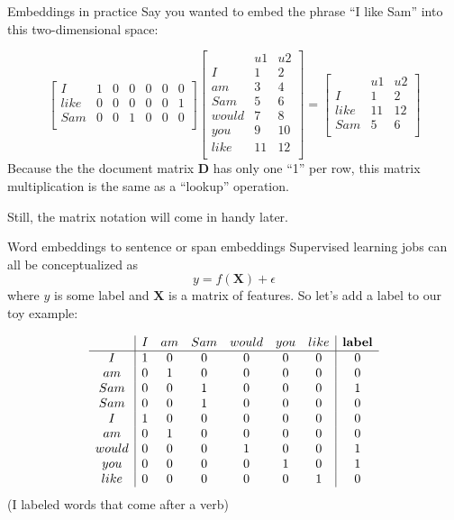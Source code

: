 \documentclass[10pt]{beamer}
\begin{document}
\begin{frame}{Embeddings in practice}
Say you wanted to embed the phrase ``I like Sam'' into this two-dimensional space:

\[ 
\left[
\begin{array}{c|cccccc}
I    & 1 & 0  & 0   & 0     & 0   &  0 \\
like & 0 & 0  & 0   & 0     & 0   &  1 \\
Sam  & 0 & 0  & 1   & 0     & 0   &  0 \\
\end{array}\right]
\left[\begin{array}{c|cccccc}
     & u1 & u2 \\
     \hline
I    & 1 & 2 \\
am   & 3 & 4  \\
Sam  & 5 & 6   \\
would& 7 & 8  \\
you  & 9 & 10  \\
like & 11 & 12  \\
\end{array}\right] = 
\left[
\begin{array}{c|cccccc}
     & u1 & u2 \\
     \hline
I    & 1 & 2 \\
like & 11 & 12  \\
Sam  & 5 & 6   \\
\end{array}
\right]
\] 
Because the the document matrix $\bm{D}$ has only one ``1'' per row, this matrix multiplication is the same as a ``lookup'' operation.

Still, the matrix notation will come in handy later.

\end{frame}


\begin{frame}{Word embeddings to sentence or span embeddings}
Supervised learning jobs can all be conceptualized as 
\[
y = f(\bm{X}) + \epsilon
\]
where $y$ is some label and $\bm{X}$ is a matrix of features.  So let's add a label to our toy example:


\[
\begin{array}{c|cccccc|c}
     & I & am & Sam & would & you & like & \text{\textbf{label}}\\
     \hline
I    & 1 & 0  & 0   & 0     & 0   &  0  & 0\\
am   & 0 & 1  & 0   & 0     & 0   &  0  & 0\\
Sam  & 0 & 0  & 1   & 0     & 0   &  0  & 1\\
Sam  & 0 & 0  & 1   & 0     & 0   &  0  & 0\\
I    & 1 & 0  & 0   & 0     & 0   &  0  & 0\\
am   & 0 & 1  & 0   & 0     & 0   &  0  & 0\\
would& 0 & 0  & 0   & 1     & 0   &  0  & 1\\
you  & 0 & 0  & 0   & 0     & 1   &  0  & 1\\
like & 0 & 0  & 0   & 0     & 0   &  1  & 0\\
\end{array}\] 
(I labeled words that come after a verb)
\end{frame}
\end{document}
